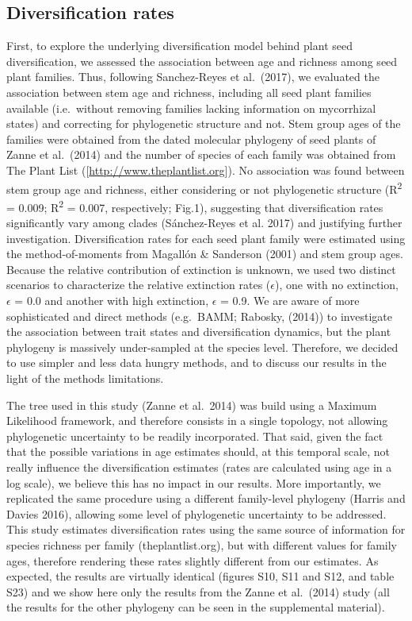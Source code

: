\documentclass[
  12pt,
]{article}
\begin{document}
\hypertarget{diversification-rates}{%
\subsection{Diversification rates}\label{diversification-rates}}

First, to explore the underlying diversification model behind plant seed
diversification, we assessed the association between age and richness
among seed plant families. Thus, following Sanchez-Reyes et al.~(2017),
we evaluated the association between stem age and richness, including
all seed plant families available (i.e.~without removing families
lacking information on mycorrhizal states) and correcting for
phylogenetic structure and not. Stem group ages of the families were
obtained from the dated molecular phylogeny of seed plants of Zanne et
al.~(2014) and the number of species of each family was obtained from
The Plant List ({[}\url{http://www.theplantlist.org}{]}). No association
was found between stem group age and richness, either considering or not
phylogenetic structure (R\textsuperscript{2} = 0.009;
R\textsuperscript{2} = 0.007, respectively; Fig.1), suggesting that
diversification rates significantly vary among clades (Sánchez-Reyes et
al. 2017) and justifying further investigation. Diversification rates
for each seed plant family were estimated using the method-of-moments
from Magallón \& Sanderson (2001) and stem group ages. Because the
relative contribution of extinction is unknown, we used two distinct
scenarios to characterize the relative extinction rates (\(\epsilon\)),
one with no extinction, \(\epsilon\) = 0.0 and another with high
extinction, \(\epsilon\) = 0.9. We are aware of more sophisticated and
direct methods (e.g.~BAMM; Rabosky, (2014)) to investigate the
association between trait states and diversification dynamics, but the
plant phylogeny is massively under-sampled at the species level.
Therefore, we decided to use simpler and less data hungry methods, and
to discuss our results in the light of the methods limitations.

The tree used in this study (Zanne et al.~2014) was build using a
Maximum Likelihood framework, and therefore consists in a single
topology, not allowing phylogenetic uncertainty to be readily
incorporated. That said, given the fact that the possible variations in
age estimates should, at this temporal scale, not really influence the
diversification estimates (rates are calculated using age in a log
scale), we believe this has no impact in our results. More importantly,
we replicated the same procedure using a different family-level
phylogeny (Harris and Davies 2016), allowing some level of phylogenetic
uncertainty to be addressed. This study estimates diversification rates
using the same source of information for species richness per family
(theplantlist.org), but with different values for family ages, therefore
rendering these rates slightly different from our estimates. As
expected, the results are virtually identical (figures S10, S11 and S12,
and table S23) and we show here only the results from the Zanne et
al.~(2014) study (all the results for the other phylogeny can be seen in
the supplemental material).
\end{document}
